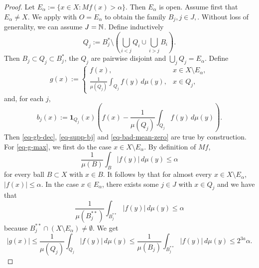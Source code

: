 \begin{proof}
Let $E_\alpha:=\{x\in X: Mf(x)>\alpha\}$.
Then $E_\alpha$ is open. Assume first that $E_\alpha \ne X$. We apply  with $O=E_\alpha$ to obtain the family $B_j, j\in J,$. Without loss of generality, we can assume $J={\mathbb{N}}$. Define inductively
\begin{equation}
    Q_j := B_j^* \setminus \left(\bigcup_{i<j} Q_i \cup \bigcup_{i>j} B_i \right).
\end{equation}
Then $B_j\subset Q_j\subset B_j^*$, the $Q_j$ are pairwise disjoint and $\bigcup_j Q_j = E_\alpha$.
Define
\begin{equation}
    \label{eq-g-def}
    g(x):=\begin{cases}
     f(x), & x\in X\setminus E_\alpha,\\
     \frac{1}{\mu(Q_j)}\int_{Q_j} f(y)\, d\mu(y), &x\in Q_j,
    \end{cases}
\end{equation}
and, for each $j$,
\begin{equation}
    b_j(x):= \mathbf{1}_{Q_j}(x) \left(f(x)-\frac{1}{\mu(Q_j)}\int_{Q_j} f(y)\, d\mu(y) \right).
\end{equation}
Then \eqref{eq-gb-dec}, \eqref{eq-supp-bj} and \eqref{eq-bad-mean-zero} are true by construction.
For \eqref{eq-g-max}, we first do the case $x\in X\setminus E_\alpha$. By definition of $Mf$,
\begin{equation}
    \frac{1}{\mu(B)}\int_B |f(y)|\,d\mu(y) \le \alpha
\end{equation}
for every ball $B\subset X$ with $x\in B$. It follows by  that for almost every $x\in X\setminus E_\alpha$, $|f(x)|\le \alpha$.
In the case $x\in E_\alpha$, there exists some $j\in J$ with $x\in Q_j$ and we have that
\begin{equation}
    \label{large-ball-estimate}
    \frac{1}{\mu(B_j^{**})} \int_{B_j^{**}} |f(y)| \,d\mu(y) \le \alpha
\end{equation}
because $B_j^{**}\cap (X\setminus E_\alpha) \ne \emptyset$. We get
\begin{equation}
    |g(x)| \le \frac{1}{\mu(Q_j)}\int_{Q_j} |f(y)|\, d\mu(y) \le \frac{1}{\mu(B_j)}\int_{B_j^{**}} |f(y)| \, d\mu(y) \le 2^{3a}\alpha .
\end{equation}


\end{proof}

